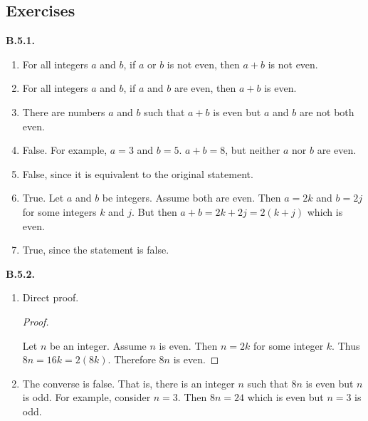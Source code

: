 \documentclass[10pt,]{book}
\theoremstyle{plain}
\theoremstyle{definition}
\theoremstyle{definition}
\theoremstyle{definition}
\theoremstyle{definition}
\numberwithin{equation}{chapter}
\begin{document}
\subsection*{ Exercises}
\noindent\textbf{B.5.1.} \hypertarget{p-2117}{}%
\leavevmode%
\begin{enumerate}[label=(\alph*)]
\item\hypertarget{li-691}{}\hypertarget{p-2118}{}%
For all integers \(a\) and \(b\), if \(a\) or \(b\) is not even, then \(a+b\) is not even.%
\item\hypertarget{li-692}{}\hypertarget{p-2119}{}%
For all integers \(a\) and \(b\), if \(a\) and \(b\) are even, then \(a+b\) is even.%
\item\hypertarget{li-693}{}\hypertarget{p-2120}{}%
There are numbers \(a\) and \(b\) such that \(a+b\) is even but \(a\) and \(b\) are not both even.%
\item\hypertarget{li-694}{}\hypertarget{p-2121}{}%
False. For example, \(a = 3\) and \(b = 5\). \(a+b = 8\), but neither \(a\) nor \(b\) are even.%
\item\hypertarget{li-695}{}\hypertarget{p-2122}{}%
False, since it is equivalent to the original statement.%
\item\hypertarget{li-696}{}\hypertarget{p-2123}{}%
True. Let \(a\) and \(b\) be integers. Assume both are even. Then \(a = 2k\) and \(b = 2j\) for some integers \(k\) and \(j\). But then \(a+b = 2k + 2j = 2(k+j)\) which is even.%
\item\hypertarget{li-697}{}\hypertarget{p-2124}{}%
True, since the statement is false.%
\end{enumerate}
%
\par\smallskip
\noindent\textbf{B.5.2.} \hypertarget{p-2129}{}%
\leavevmode%
\begin{enumerate}[label=(\alph*)]
\item\hypertarget{li-700}{}\hypertarget{p-2130}{}%
Direct proof. \begin{proof}\hypertarget{proof-30}{}
\hypertarget{p-2131}{}%
Let \(n\) be an integer. Assume \(n\) is even. Then \(n = 2k\) for some integer \(k\). Thus \(8n = 16k = 2(8k)\). Therefore \(8n\) is even.%
\end{proof}
%
\item\hypertarget{li-701}{}\hypertarget{p-2132}{}%
The converse is false. That is, there is an integer \(n\) such that \(8n\) is even but \(n\) is odd. For example, consider \(n = 3\). Then \(8n = 24\) which is even but \(n = 3\) is odd.%
\end{enumerate}
%
\par\smallskip
\end{document}
